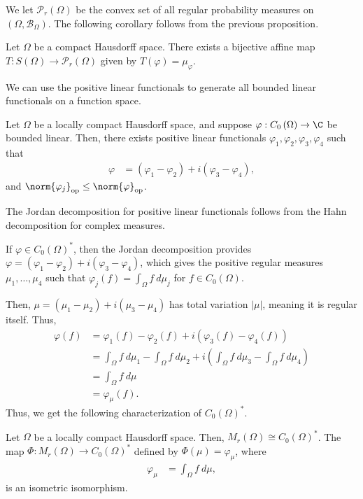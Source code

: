 \documentclass[10pt]{mypackage}
\begin{document}
We let $\mathcal{P}_r\left(\Omega\right)$ be the convex set of all regular probability measures on $\left(\Omega,\mathcal{B}_\Omega\right)$. The following corollary follows from the previous proposition.
\begin{corollary}
  Let $\Omega$ be a compact Hausdorff space. There exists a bijective affine map $T: S\left(\Omega\right)\rightarrow \mathcal{P}_{r}\left(\Omega\right)$ given by $T\left(\varphi\right) = \mu_{\varphi}$.
\end{corollary}
We can use the positive linear functionals to generate all bounded linear functionals on a function space.
\begin{theorem}
  Let $\Omega$ be a locally compact Hausdorff space, and suppose $\varphi: C_0\left(\Omega\right)\rightarrow \C$ be bounded linear. Then, there exists positive linear functionals $\varphi_1,\varphi_2,\varphi_3,\varphi_4$ such that
  \begin{align*}
    \varphi &= \left(\varphi_1-\varphi_2\right) + i\left(\varphi_3 - \varphi_4\right),
  \end{align*}
  and $\norm{\varphi_j}_{\text{op}}\leq \norm{\varphi}_{\text{op}}$.
\end{theorem}
\begin{remark}
  The Jordan decomposition for positive linear functionals follows from the Hahn decomposition for complex measures.
\end{remark}
If $\varphi\in C_0\left(\Omega\right)^{\ast}$, then the Jordan decomposition provides $\varphi = \left(\varphi_1-\varphi_2\right) + i\left(\varphi_3 - \varphi_4\right)$, which gives the positive regular measures $\mu_1,\dots,\mu_4$ such that $\varphi_j\left(f\right) = \int_{\Omega}f\:d\mu_j$ for $f\in C_0\left(\Omega\right)$.\newline

Then, $\mu = \left(\mu_1 - \mu_2\right) + i\left(\mu_3 - \mu_4\right)$ has total variation $\left\vert \mu \right\vert$, meaning it is regular itself. Thus,
\begin{align*}
  \varphi(f) &= \varphi_1\left(f\right) - \varphi_2\left(f\right) + i\left(\varphi_3\left(f\right) - \varphi_4\left(f\right)\right)\\
             &= \int_{\Omega}f\:d\mu_1 - \int_{\Omega}f\:d\mu_2 + i \left(\int_{\Omega}f\:d\mu_3 - \int_{\Omega}f\:d\mu_4\right)\\
             &= \int_{\Omega}f\:d\mu\\
             &= \varphi_{\mu}\left(f\right).
\end{align*}
Thus, we get the following characterization of $C_0\left(\Omega\right)^{\ast}$.
\begin{theorem}
  Let $\Omega$ be a locally compact Hausdorff space. Then, $M_r\left(\Omega\right) \cong C_0\left(\Omega\right)^{\ast}$. The map $\Phi: M_r\left(\Omega\right)\rightarrow C_0\left(\Omega\right)^{\ast}$ defined by $\Phi\left(\mu\right) = \varphi_{\mu}$, where
  \begin{align*}
    \varphi_\mu &= \int_{\Omega}f\:d\mu,
  \end{align*}
  is an isometric isomorphism.
\end{theorem}
\end{document}
